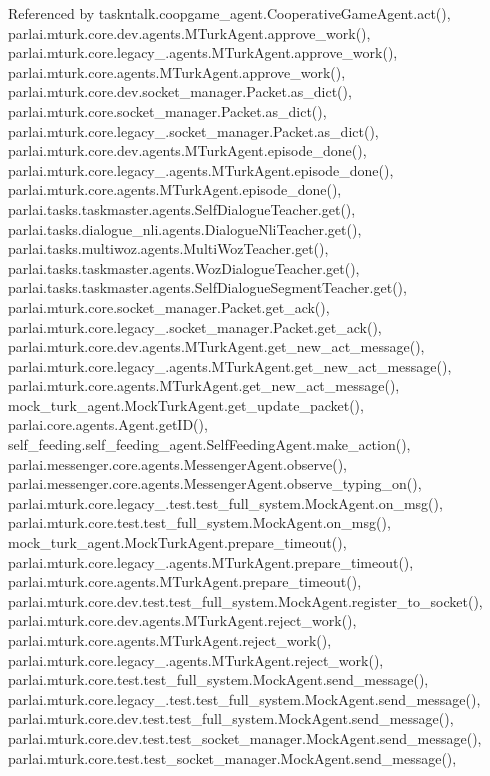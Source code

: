 Referenced by taskntalk.\+coopgame\+\_\+agent.\+Cooperative\+Game\+Agent.\+act(), parlai.\+mturk.\+core.\+dev.\+agents.\+M\+Turk\+Agent.\+approve\+\_\+work(), parlai.\+mturk.\+core.\+legacy\+\_.\+agents.\+M\+Turk\+Agent.\+approve\+\_\+work(), parlai.\+mturk.\+core.\+agents.\+M\+Turk\+Agent.\+approve\+\_\+work(), parlai.\+mturk.\+core.\+dev.\+socket\+\_\+manager.\+Packet.\+as\+\_\+dict(), parlai.\+mturk.\+core.\+socket\+\_\+manager.\+Packet.\+as\+\_\+dict(), parlai.\+mturk.\+core.\+legacy\+\_.\+socket\+\_\+manager.\+Packet.\+as\+\_\+dict(), parlai.\+mturk.\+core.\+dev.\+agents.\+M\+Turk\+Agent.\+episode\+\_\+done(), parlai.\+mturk.\+core.\+legacy\+\_.\+agents.\+M\+Turk\+Agent.\+episode\+\_\+done(), parlai.\+mturk.\+core.\+agents.\+M\+Turk\+Agent.\+episode\+\_\+done(), parlai.\+tasks.\+taskmaster.\+agents.\+Self\+Dialogue\+Teacher.\+get(), parlai.\+tasks.\+dialogue\+\_\+nli.\+agents.\+Dialogue\+Nli\+Teacher.\+get(), parlai.\+tasks.\+multiwoz.\+agents.\+Multi\+Woz\+Teacher.\+get(), parlai.\+tasks.\+taskmaster.\+agents.\+Woz\+Dialogue\+Teacher.\+get(), parlai.\+tasks.\+taskmaster.\+agents.\+Self\+Dialogue\+Segment\+Teacher.\+get(), parlai.\+mturk.\+core.\+socket\+\_\+manager.\+Packet.\+get\+\_\+ack(), parlai.\+mturk.\+core.\+legacy\+\_.\+socket\+\_\+manager.\+Packet.\+get\+\_\+ack(), parlai.\+mturk.\+core.\+dev.\+agents.\+M\+Turk\+Agent.\+get\+\_\+new\+\_\+act\+\_\+message(), parlai.\+mturk.\+core.\+legacy\+\_.\+agents.\+M\+Turk\+Agent.\+get\+\_\+new\+\_\+act\+\_\+message(), parlai.\+mturk.\+core.\+agents.\+M\+Turk\+Agent.\+get\+\_\+new\+\_\+act\+\_\+message(), mock\+\_\+turk\+\_\+agent.\+Mock\+Turk\+Agent.\+get\+\_\+update\+\_\+packet(), parlai.\+core.\+agents.\+Agent.\+get\+I\+D(), self\+\_\+feeding.\+self\+\_\+feeding\+\_\+agent.\+Self\+Feeding\+Agent.\+make\+\_\+action(), parlai.\+messenger.\+core.\+agents.\+Messenger\+Agent.\+observe(), parlai.\+messenger.\+core.\+agents.\+Messenger\+Agent.\+observe\+\_\+typing\+\_\+on(), parlai.\+mturk.\+core.\+legacy\+\_.\+test.\+test\+\_\+full\+\_\+system.\+Mock\+Agent.\+on\+\_\+msg(), parlai.\+mturk.\+core.\+test.\+test\+\_\+full\+\_\+system.\+Mock\+Agent.\+on\+\_\+msg(), mock\+\_\+turk\+\_\+agent.\+Mock\+Turk\+Agent.\+prepare\+\_\+timeout(), parlai.\+mturk.\+core.\+legacy\+\_.\+agents.\+M\+Turk\+Agent.\+prepare\+\_\+timeout(), parlai.\+mturk.\+core.\+agents.\+M\+Turk\+Agent.\+prepare\+\_\+timeout(), parlai.\+mturk.\+core.\+dev.\+test.\+test\+\_\+full\+\_\+system.\+Mock\+Agent.\+register\+\_\+to\+\_\+socket(), parlai.\+mturk.\+core.\+dev.\+agents.\+M\+Turk\+Agent.\+reject\+\_\+work(), parlai.\+mturk.\+core.\+agents.\+M\+Turk\+Agent.\+reject\+\_\+work(), parlai.\+mturk.\+core.\+legacy\+\_.\+agents.\+M\+Turk\+Agent.\+reject\+\_\+work(), parlai.\+mturk.\+core.\+test.\+test\+\_\+full\+\_\+system.\+Mock\+Agent.\+send\+\_\+message(), parlai.\+mturk.\+core.\+legacy\+\_.\+test.\+test\+\_\+full\+\_\+system.\+Mock\+Agent.\+send\+\_\+message(), parlai.\+mturk.\+core.\+dev.\+test.\+test\+\_\+full\+\_\+system.\+Mock\+Agent.\+send\+\_\+message(), parlai.\+mturk.\+core.\+dev.\+test.\+test\+\_\+socket\+\_\+manager.\+Mock\+Agent.\+send\+\_\+message(), parlai.\+mturk.\+core.\+test.\+test\+\_\+socket\+\_\+manager.\+Mock\+Agent.\+send\+\_\+message(), 